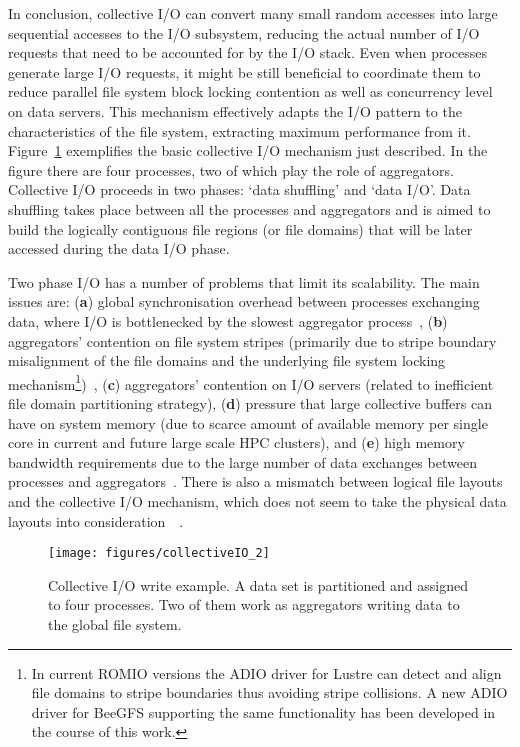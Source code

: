 In conclusion, collective I/O can convert many small random accesses into large sequential accesses to the I/O subsystem, reducing the actual number of I/O requests that need to be accounted for by the I/O stack. Even when processes generate large I/O requests, it might be still beneficial to coordinate them to reduce parallel file system block locking contention as well as concurrency level on data servers. This mechanism effectively adapts the I/O pattern to the characteristics of the file system, extracting maximum performance from it.
Figure~\ref{figure: coll_io} exemplifies the basic collective I/O mechanism just described. In the figure there are four processes, two of which play the role of aggregators. Collective I/O proceeds in two phases: `data shuffling' and `data I/O'. Data shuffling takes place between all the processes and aggregators and is aimed to build the logically contiguous file regions (or file domains) that will be later accessed during the data I/O phase.

Two phase I/O has a number of problems that limit its scalability. The main issues are: (\textbf{a}) global synchronisation overhead between processes exchanging data, where I/O is bottlenecked by the slowest aggregator process~\cite{WeikuanV08}, (\textbf{b}) aggregators' contention on file system stripes (primarily due to stripe boundary misalignment of the file domains and the underlying file system locking mechanism\footnote{In current ROMIO versions the ADIO driver for Lustre can detect and align file domains to stripe boundaries thus avoiding stripe collisions. A new ADIO driver for BeeGFS supporting the same functionality has been developed in the course of this work.})~\cite{LiaoA08}, (\textbf{c}) aggregators' contention on I/O servers (related to inefficient file domain partitioning strategy), (\textbf{d}) pressure that large collective buffers can have on system memory (due to scarce amount of available memory per single core in current and future large scale HPC clusters), and (\textbf{e}) high memory bandwidth requirements due to the large number of data exchanges between processes and aggregators~\cite{YinYTY12}. There is also a mismatch between logical file layouts and the collective I/O mechanism, which does not seem to take the physical data layouts into consideration~\cite{YongXTRG11}~\cite{XuechenJD09}.
\begin{figure}[!htb]
  \centering
  \texttt{[image: figures/collectiveIO\_2]}
  \caption{Collective I/O write example. A data set is partitioned and assigned to four processes. Two of them work as aggregators writing data to the global file system.}
  \label{figure: coll_io}
\end{figure}

